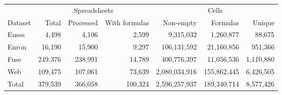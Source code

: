 \begin{tabular}{l|rrr|rrr}
\toprule
 & \multicolumn{3}{|c|}{Spreadsheets}   &  \multicolumn{3}{|c}{Cells}   \\
Dataset & Total & Processed & With formulas & Non-empty & Formulas & Unique \\
\midrule
Euses & 4,498   & 4,106     & 2,599  & 9,315,032    & 1,260,877  & 88,675 \\
Enron & 16,190  & 15,900    & 9,297  & 106,131,592  & 21,160,856 & 951,366 \\
Fuse  & 249,376 & 238,991   & 14,789 & 400,776,397  & 11,056,536 & 1,110,880 \\
Web   & 109,475 & 107,061   & 73,639 & 2,080,034,916& 155,862,445& 6,426,505 \\
\midrule
Total & 379,539	& 366,058 	& 100,324& 2,596,257,937& 189,340,714& 8,577,426\\
\bottomrule
\end{tabular}